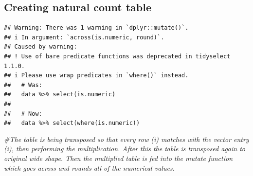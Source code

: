\documentclass[
]{article}
\newenvironment{Shaded}{\begin{snugshade}}{\end{snugshade}}
\newcommand{\CommentTok}[1]{\textcolor[rgb]{0.56,0.35,0.01}{\textit{#1}}}
\newcommand{\DecValTok}[1]{\textcolor[rgb]{0.00,0.00,0.81}{#1}}
\newcommand{\FunctionTok}[1]{\textcolor[rgb]{0.13,0.29,0.53}{\textbf{#1}}}
\newcommand{\NormalTok}[1]{#1}
\newcommand{\OtherTok}[1]{\textcolor[rgb]{0.56,0.35,0.01}{#1}}
\newcommand{\SpecialCharTok}[1]{\textcolor[rgb]{0.81,0.36,0.00}{\textbf{#1}}}
\begin{document}
\subsection{Creating natural count
table}\label{creating-natural-count-table}

\begin{Shaded}
\end{Shaded}

\begin{verbatim}
## Warning: There was 1 warning in `dplyr::mutate()`.
## i In argument: `across(is.numeric, round)`.
## Caused by warning:
## ! Use of bare predicate functions was deprecated in tidyselect 1.1.0.
## i Please use wrap predicates in `where()` instead.
##   # Was:
##   data %>% select(is.numeric)
## 
##   # Now:
##   data %>% select(where(is.numeric))
\end{verbatim}

\begin{Shaded}
\begin{Highlighting}[]
\CommentTok{\#The table is being transposed so that every row (i) matches with the vector entry (i\textquotesingle{}), then performing the multiplication. After this the table is transposed again to original wide shape. Then the multiplied table is fed into the mutate function which goes across and rounds all of the numerical values.}
\end{Highlighting}
\end{Shaded}
\end{document}
